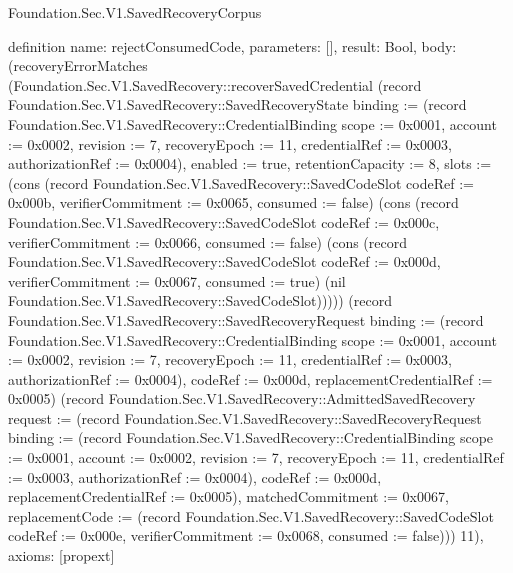 \begin{lexlean}{Foundation.Sec.V1.SavedRecoveryCorpus}
\begin{semanticmodule}
definition{
  name: rejectConsumedCode,
  parameters: [],
  result: Bool,
  body: (recoveryErrorMatches (Foundation.Sec.V1.SavedRecovery::recoverSavedCredential (record Foundation.Sec.V1.SavedRecovery::SavedRecoveryState {binding := (record Foundation.Sec.V1.SavedRecovery::CredentialBinding {scope := 0x0001, account := 0x0002, revision := 7, recoveryEpoch := 11, credentialRef := 0x0003, authorizationRef := 0x0004}), enabled := true, retentionCapacity := 8, slots := (cons (record Foundation.Sec.V1.SavedRecovery::SavedCodeSlot {codeRef := 0x000b, verifierCommitment := 0x0065, consumed := false}) (cons (record Foundation.Sec.V1.SavedRecovery::SavedCodeSlot {codeRef := 0x000c, verifierCommitment := 0x0066, consumed := false}) (cons (record Foundation.Sec.V1.SavedRecovery::SavedCodeSlot {codeRef := 0x000d, verifierCommitment := 0x0067, consumed := true}) (nil Foundation.Sec.V1.SavedRecovery::SavedCodeSlot))))}) (record Foundation.Sec.V1.SavedRecovery::SavedRecoveryRequest {binding := (record Foundation.Sec.V1.SavedRecovery::CredentialBinding {scope := 0x0001, account := 0x0002, revision := 7, recoveryEpoch := 11, credentialRef := 0x0003, authorizationRef := 0x0004}), codeRef := 0x000d, replacementCredentialRef := 0x0005}) (record Foundation.Sec.V1.SavedRecovery::AdmittedSavedRecovery {request := (record Foundation.Sec.V1.SavedRecovery::SavedRecoveryRequest {binding := (record Foundation.Sec.V1.SavedRecovery::CredentialBinding {scope := 0x0001, account := 0x0002, revision := 7, recoveryEpoch := 11, credentialRef := 0x0003, authorizationRef := 0x0004}), codeRef := 0x000d, replacementCredentialRef := 0x0005}), matchedCommitment := 0x0067, replacementCode := (record Foundation.Sec.V1.SavedRecovery::SavedCodeSlot {codeRef := 0x000e, verifierCommitment := 0x0068, consumed := false})})) 11),
  axioms: [propext]
}


\end{semanticmodule}
\end{lexlean}
